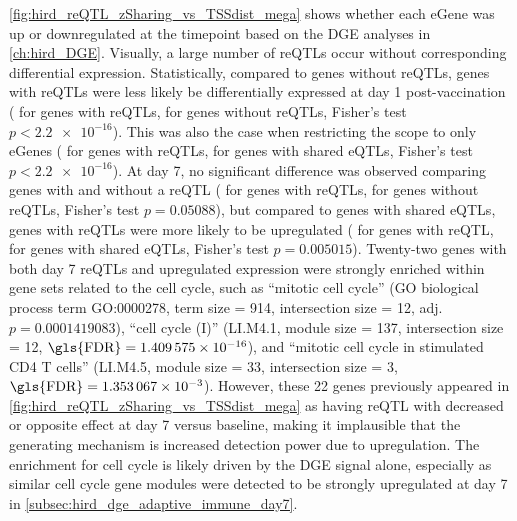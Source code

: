 \cref{fig:hird_reQTL_zSharing_vs_TSSdist_mega} shows whether each eGene was up or downregulated at the timepoint based on the \gls{DGE} analyses in \cref{ch:hird_DGE}.
Visually, a large number of \glspl{reQTL} occur without corresponding differential expression.
Statistically, compared to genes without \glspl{reQTL},
genes with \glspl{reQTL} were less likely be differentially expressed at day 1 post-vaccination ( for genes with \glspl{reQTL},  for genes without \glspl{reQTL}, Fisher's test $p < \num{2.2e-16}$).
This was also the case when restricting the scope to only eGenes ( for genes with \glspl{reQTL},  for genes with shared \glspl{eQTL}, Fisher's test $p < \num{2.2e-16}$).
%
At day 7,
no significant difference was observed comparing genes with and without a \gls{reQTL} ( for genes with \glspl{reQTL},  for genes without \glspl{reQTL}, Fisher's test $p = \num{0.05088}$),
but compared to genes with shared \glspl{eQTL},
genes with \glspl{reQTL} were more likely to be upregulated
( for genes with reQTL,  for genes with shared eQTLs, Fisher's test $p = \num{0.005015}$).
Twenty-two genes with both day 7 \glspl{reQTL} and upregulated expression were strongly enriched within gene sets related to the cell cycle, such as
\enquote{mitotic cell cycle} (\gls{GO} biological process term GO:0000278, term size = 914, intersection size = 12,  \autocite{raudvere2019ProfilerWebServer} adj. $p = \num[scientific-notation = true]{0.0001419083}$),
\enquote{cell cycle (I)} (LI.M4.1, module size = 137, intersection size = 12,  \autocite{weiner3rd2016TmodPackageGeneral} $\text{\gls{FDR}} = \num{1.409575e-16}$),
and \enquote{mitotic cell cycle in stimulated CD4 T cells} (LI.M4.5, module size = 33, intersection size = 3,  $\text{\gls{FDR}} = \num{1.353067e-03}$).
However, these 22 genes previously appeared in \cref{fig:hird_reQTL_zSharing_vs_TSSdist_mega} as having \gls{reQTL} with decreased or opposite effect at day 7 versus baseline,
making it implausible that the generating mechanism is increased detection power due to upregulation.
The enrichment for cell cycle is likely driven by the \gls{DGE} signal alone,
especially as similar cell cycle gene modules were detected to be strongly upregulated at day 7 in \cref{subsec:hird_dge_adaptive_immune_day7}.


